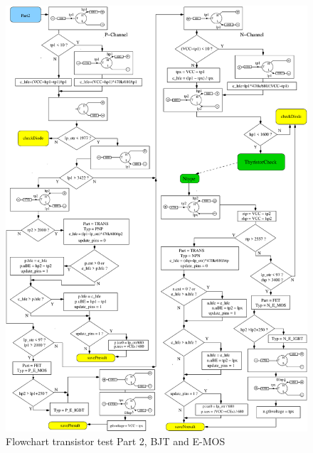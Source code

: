 \begin{figure}[H]
\centering
\includegraphics[]{../FIG/CheckSemi2.pdf}
\caption{Flowchart transistor test Part 2, BJT and E-MOS}
\label{fig:ChkSemi2}
\end{figure}

